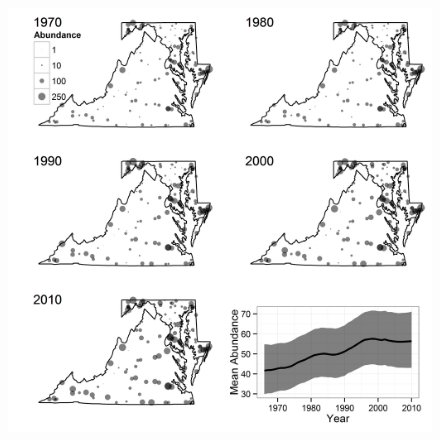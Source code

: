 \documentclass[12pt,english]{article}
\begin{document}
\begin{spacing}{1.9}
\begin{flushleft}
\begin{figure}
\caption{}
  \centering
  \includegraphics[width=6.6in]{figs/OVEN_N_by_route_year8}
\label{fig:oven_N}
\end{figure}
\end{flushleft}
\end{spacing}
\end{document}
